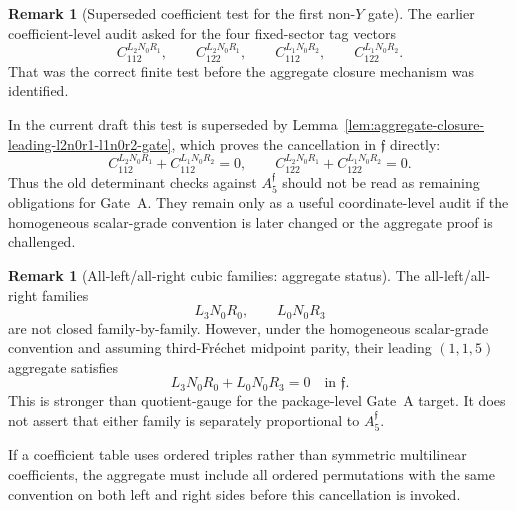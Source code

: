 \documentclass[11pt,a4paper]{amsart}
\theoremstyle{plain}
\theoremstyle{definition}
\newtheorem{remark}[theorem]{Remark}
\begin{document}
\begin{remark}[Superseded coefficient test for the first non-\(Y\) gate]
\label{target:leading-coefficient-test-first-non-y-cubic-gate}
The earlier coefficient-level audit asked for the four fixed-sector tag
vectors
\[
C_{112}^{L_2N_0R_1},\qquad
C_{122}^{L_2N_0R_1},\qquad
C_{112}^{L_1N_0R_2},\qquad
C_{122}^{L_1N_0R_2}.
\]
That was the correct finite test before the aggregate closure mechanism
was identified.

In the current draft this test is superseded by
Lemma~\ref{lem:aggregate-closure-leading-l2n0r1-l1n0r2-gate}, which proves
the cancellation in \(\mathfrak f\) directly:
\[
C_{112}^{L_2N_0R_1}+C_{112}^{L_1N_0R_2}=0,
\qquad
C_{122}^{L_2N_0R_1}+C_{122}^{L_1N_0R_2}=0.
\]
Thus the old determinant checks against \(A_5^{\mathfrak f}\) should not
be read as remaining obligations for Gate~A.  They remain only as a
useful coordinate-level audit if the homogeneous scalar-grade convention
is later changed or the aggregate proof is challenged.
\end{remark}

\begin{remark}[All-left/all-right cubic families: aggregate status]
\label{rem:all-left-all-right-families-aggregate-status}
The all-left/all-right families
\[
L_3N_0R_0,
\qquad
L_0N_0R_3
\]
are not closed family-by-family.  However, under the homogeneous
scalar-grade convention and assuming third-Fr\'echet midpoint parity, their
leading \((1,1,5)\) aggregate satisfies
\[
L_3N_0R_0+L_0N_0R_3=0
\quad\text{in }\mathfrak f.
\]
This is stronger than quotient-gauge for the package-level Gate~A target.
It does not assert that either family is separately proportional to
\(A_5^{\mathfrak f}\).

If a coefficient table uses ordered triples rather than symmetric
multilinear coefficients, the aggregate must include all ordered
permutations with the same convention on both left and right sides before
this cancellation is invoked.
\end{remark}
\end{document}
